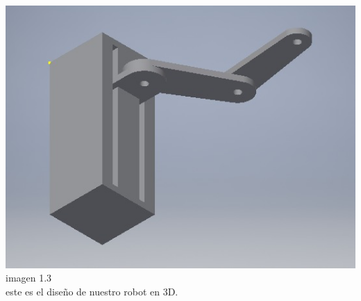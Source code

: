 \documentclass[10pt,a4paper]{article}
\begin{document}
\begin{center}
\includegraphics[scale=0.5]{imagenes/prototipo.png} imagen 1.3  
\\{este es el diseño de nuestro robot en 3D.} \\ 
\end{center}
\end{document}
